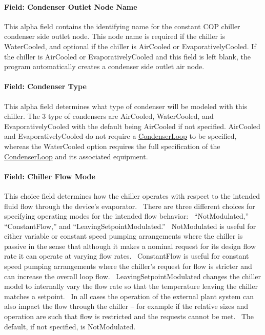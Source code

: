 \paragraph{Field: Condenser Outlet Node Name}\label{field-condenser-outlet-node-name-2}

This alpha field contains the identifying name for the constant COP chiller condenser side outlet node. This node name is required if the chiller is WaterCooled, and optional if the chiller is AirCooled or EvaporativelyCooled. If the chiller is AirCooled or EvaporativelyCooled and this field is left blank, the program automatically creates a condenser side outlet air node.

\paragraph{Field: Condenser Type}\label{field-condenser-type-001}

This alpha field determines what type of condenser will be modeled with this chiller. The 3 type of condensers are AirCooled, WaterCooled, and EvaporativelyCooled with the default being AirCooled if not specified. AirCooled and EvaporativelyCooled do not require a \hyperref[condenserloop]{CondenserLoop} to be specified, whereas the WaterCooled option requires the full specification of the \hyperref[condenserloop]{CondenserLoop} and its associated equipment.

\paragraph{Field: Chiller Flow Mode}\label{field-chiller-flow-mode-2}

This choice field determines how the chiller operates with respect to the intended fluid flow through the device's evaporator.~ There are three different choices for specifying operating modes for the intended flow behavior:~ ``NotModulated,'' ``ConstantFlow,'' and ``LeavingSetpointModulated.''~ NotModulated is useful for either variable or constant speed pumping arrangements where the chiller is passive in the sense that although it makes a nominal request for its design flow rate it can operate at varying flow rates.~ ConstantFlow is useful for constant speed pumping arrangements where the chiller's request for flow is stricter and can increase the overall loop flow.~ LeavingSetpointModulated changes the chiller model to internally vary the flow rate so that the temperature leaving the chiller matches a setpoint.~ In all cases the operation of the external plant system can also impact the flow through the chiller -- for example if the relative sizes and operation are such that flow is restricted and the requests cannot be met.~ The default, if not specified, is NotModulated.

